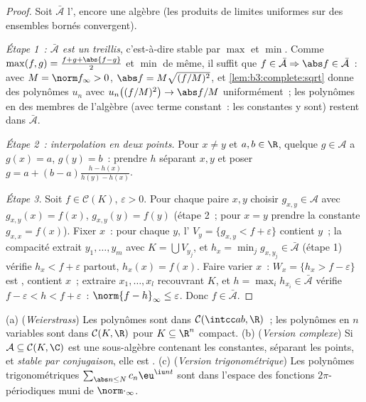 \begin{proof}
Soit $\bar{\mathcal A}$ l', encore une algèbre (les
produits de limites uniformes sur des ensembles bornés
convergent).

\emph{Étape 1~: $\bar{\mathcal A}$ est un treillis}, c'est-à-dire
stable par $\max$ et $\min$. Comme $\max(f,g) = \frac{f + g +
\abs{f-g}}2$ et $\min$ de même, il suffit que $f \in
\bar{\mathcal A} \Rightarrow \abs f \in \bar{\mathcal A}$~: avec
$M = \norm f_\infty > 0$, $\abs f = M\sqrt{(f/M)^2}$, et
\cref{lem:b3:complete:sqrt} donne des polynômes $u_n$ avec
$u_n\bigl((f/M)^2\bigr) \to \abs f/M$ uniformément~; les
polynômes en des membres de l'algèbre (avec terme constant~: les
constantes y sont) restent dans $\bar{\mathcal A}$.

\emph{Étape 2~: interpolation en deux points.} Pour $x \neq y$
et $a, b \in \R$, quelque $g \in \mathcal A$ a $g(x) = a$,
$g(y) = b$~: prendre $h$ séparant $x, y$ et poser $g = a + (b -
a)\frac{h - h(x)}{h(y) - h(x)}$.

\emph{Étape 3.} Soit $f \in \mathcal C(K)$, $\varepsilon > 0$.
Pour chaque paire $x, y$ choisir $g_{x,y} \in \mathcal A$ avec
$g_{x,y}(x) = f(x)$, $g_{x,y}(y) = f(y)$ (étape 2~; pour $x =
y$ prendre la constante $g_{x,x} = f(x)$).
Fixer $x$~: pour chaque $y$, l' $V_y = \{g_{x,y} < f +
\varepsilon\}$ contient $y$~; la compacité extrait $y_1, \dots,
y_m$ avec $K = \bigcup V_{y_j}$, et $h_x = \min_j g_{x, y_j}
\in \bar{\mathcal A}$ (étape 1) vérifie $h_x < f +
\varepsilon$ partout, $h_x(x) = f(x)$. Faire varier $x$~: $W_x
= \{h_x > f - \varepsilon\}$ est , contient $x$~; extraire
$x_1, \dots, x_l$ recouvrant $K$, et $h = \max_i h_{x_i} \in
\bar{\mathcal A}$ vérifie $f - \varepsilon < h < f +
\varepsilon$~: $\norm{f - h}_\infty \leq \varepsilon$. Donc $f
\in \bar{\mathcal A}$.
\end{proof}

\begin{corollary}\label{cor:b3:complete:weierstrass}
(a) (\emph{Weierstrass}) Les polynômes sont  dans
$\mathcal C(\intcc ab, \R)$~; les polynômes en $n$ variables
sont  dans $\mathcal C(K, \R)$ pour $K \subseteq \R^n$
compact.
(b) (\emph{Version complexe}) Si $\mathcal A \subseteq \mathcal
C(K, \C)$ est une sous-algèbre contenant les constantes,
séparant les points, et \emph{stable par conjugaison}, elle est
.
(c) (\emph{Version trigonométrique}) Les polynômes
trigonométriques $\sum_{\abs n \leq N}c_n\eu^{\iu n t}$ sont
 dans l'espace des fonctions  $2\pi$-périodiques
muni de $\norm\cdot_\infty$.
\end{corollary}

